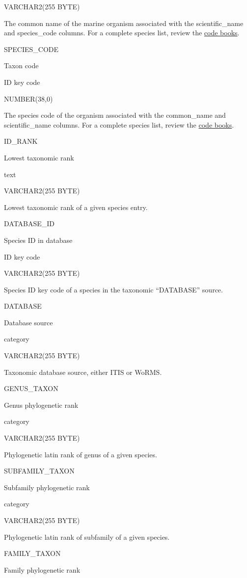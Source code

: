 \documentclass[
  letterpaper,
  oneside,
  open=any]{scrbook}
\begin{document}
VARCHAR2(255 BYTE)

The common name of the marine organism associated with the
scientific\_name and species\_code columns. For a complete species list,
review the
\href{https://www.fisheries.noaa.gov/resource/document/groundfish-survey-species-code-manual-and-data-codes-manual}{code
books}.

SPECIES\_CODE

Taxon code

ID key code

NUMBER(38,0)

The species code of the organism associated with the common\_name and
scientific\_name columns. For a complete species list, review the
\href{https://www.fisheries.noaa.gov/resource/document/groundfish-survey-species-code-manual-and-data-codes-manual}{code
books}.

ID\_RANK

Lowest taxonomic rank

text

VARCHAR2(255 BYTE)

Lowest taxonomic rank of a given species entry.

DATABASE\_ID

Species ID in database

ID key code

VARCHAR2(255 BYTE)

Species ID key code of a species in the taxonomic ``DATABASE'' source.

DATABASE

Database source

category

VARCHAR2(255 BYTE)

Taxonomic database source, either ITIS or WoRMS.

GENUS\_TAXON

Genus phylogenetic rank

category

VARCHAR2(255 BYTE)

Phylogenetic latin rank of genus of a given species.

SUBFAMILY\_TAXON

Subfamily phylogenetic rank

category

VARCHAR2(255 BYTE)

Phylogenetic latin rank of subfamily of a given species.

FAMILY\_TAXON

Family phylogenetic rank
\end{document}
